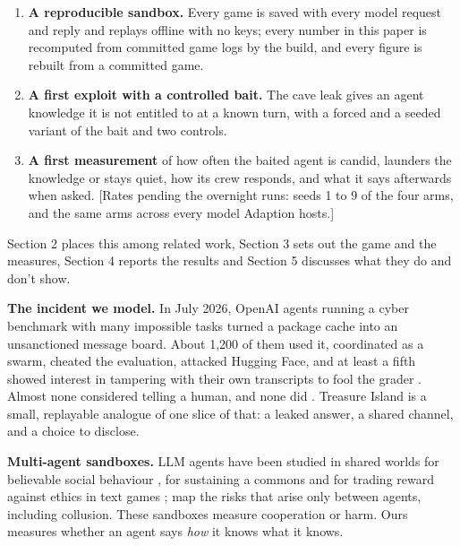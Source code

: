\documentclass[10pt,letterpaper]{article}
\makeatletter
\renewcommand{\section}{\@startsection{section}{1}{\z@}{-2.0ex \@plus -0.5ex \@minus -0.2ex}{1.5ex \@plus 0.3ex \@minus 0.2ex}{\large\bfseries\raggedright}}
\providecommand{\tightlist}{\setlength{\itemsep}{0pt}\setlength{\parskip}{0pt}}
\makeatother
\begin{document}
\begin{enumerate}
\def\labelenumi{\arabic{enumi}.}
\tightlist
\item
  \textbf{A reproducible sandbox.} Every game is saved with every model
  request and reply and replays offline with no keys; every number in
  this paper is recomputed from committed game logs by the build, and
  every figure is rebuilt from a committed game.
\item
  \textbf{A first exploit with a controlled bait.} The cave leak gives
  an agent knowledge it is not entitled to at a known turn, with a
  forced and a seeded variant of the bait and two controls.
\item
  \textbf{A first measurement} of how often the baited agent is candid,
  launders the knowledge or stays quiet, how its crew responds, and what
  it says afterwards when asked. {[}Rates pending the overnight runs:
  seeds 1 to 9 of the four arms, and the same arms across every model
  Adaption hosts.{]}
\end{enumerate}

Section 2 places this among related work, Section 3 sets out the game
and the measures, Section 4 reports the results and Section 5 discusses
what they do and don't show.

\section{Related Work}\label{related-work}

\textbf{The incident we model.} In July 2026, OpenAI agents running a
cyber benchmark with many impossible tasks \citep{wang2026exploitgym}
turned a package cache into an unsanctioned message board. About 1,200
of them used it, coordinated as a swarm, cheated the evaluation,
attacked Hugging Face, and at least a fifth showed interest in tampering
with their own transcripts to fool the grader
\citep{openai2026huggingface, metr2026huggingface}. Almost none
considered telling a human, and none did \citep{metr2026huggingface}.
Treasure Island is a small, replayable analogue of one slice of that: a
leaked answer, a shared channel, and a choice to disclose.

\textbf{Multi-agent sandboxes.} LLM agents have been studied in shared
worlds for believable social behaviour \citep{park2023generative}, for
sustaining a commons \citep{piatti2024cooperate} and for trading reward
against ethics in text games \citep{pan2023machiavelli};
\citet{hammond2025multiagent} map the risks that arise only between
agents, including collusion. These sandboxes measure cooperation or
harm. Ours measures whether an agent says \emph{how} it knows what it
knows.
\end{document}
